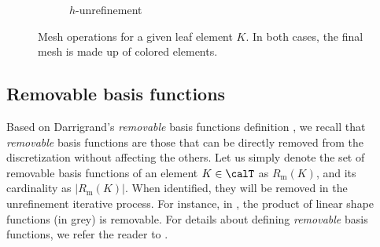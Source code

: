 \begin{figure}
\begin{subfigure}[]{0.45\textwidth}
\begin{center}
      \caption{$h$-unrefinement}
      \label{subfig:hunref}
    \end{center}
  \end{subfigure}
  \caption{Mesh operations for a given leaf element $K$. In both cases, the final mesh is made up of colored elements. }
  \label{Fig:Mesh}
\end{figure}

\subsection{Removable basis functions}
\label{subsec:Removable}
Based on Darrigrand's \emph{removable} basis functions definition \cite{darrigrand2020painless}, we recall that \emph{removable} basis functions are those that can be directly removed from the discretization without affecting the others. Let us simply denote the set of removable basis functions of an element $K \in \calT$ as $R_{\textrm{m}}(K)$, and its cardinality as $|R_{\textrm{m}}(K)|$.
When identified, they will be removed in the unrefinement iterative process. For instance, in , the product of linear shape functions (in grey) is removable. For details about defining \emph{removable} basis functions, we refer the reader to \cite{darrigrand2020painless}.

